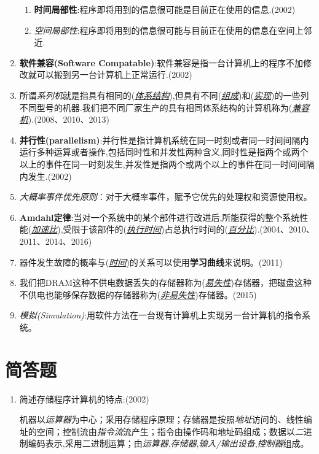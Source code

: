 \documentclass[a4paper]{ctexbook}
\newcommand{\blank}[1]{(\emph{\underline{#1}})}
\begin{document}
\begin{enumerate}
  \begin{enumerate}
    \item \textbf{时间局部性}:程序即将用到的信息很可能是目前正在使用的信息.(2002)
    \item \emph{空间局部性}:程序即将用到的信息很可能与目前正在使用的信息在空间上邻近.
  \end{enumerate}
  \item \textbf{软件兼容(Software Compatable)}:软件兼容是指一台计算机上的程序不加修改就可以搬到另一台计算机上正常运行.(2002)
  \item 所谓\emph{系列机}就是指具有相同的(\emph{\underline{体系结构}}),但具有不同(\emph{\underline{组成}})和(\emph{\underline{实现}})的一些列不同型号的机器.我们把不同厂家生产的具有相同体系结构的计算机称为(\emph{\underline{兼容机}}).(2008、2010、2013)
  \item \textbf{并行性(parallelism)}:并行性是指计算机系统在同一时刻或者同一时间间隔内运行多种运算或者操作,包括同时性和并发性两种含义,同时性是指两个或两个以上的事件在同一时刻发生,并发性是指两个或两个以上的事件在同一时间间隔内发生.(2002)
  \item \emph{大概率事件优先原则}：对于大概率事件，赋予它优先的处理权和资源使用权。
  \item \textbf{Amdahl定律}:当对一个系统中的某个部件进行改进后,所能获得的整个系统性能\blank{加速比},受限于该部件的\blank{执行时间}占总执行时间的\blank{百分比}.(2004、2010、2011、2014、2016)
  \item 器件发生故障的概率与\blank{时间}的关系可以使用\textbf{学习曲线}来说明。(2011)
  \item 我们把DRAM这种不供电数据丢失的存储器称为\blank{易失性}存储器，把磁盘这种不供电也能够保存数据的存储器称为\blank{非易失性}存储器。(2015)
  \item \emph{模拟(Simulation)}:用软件方法在一台现有计算机上实现另一台计算机的指令系统。
\end{enumerate}
\section{简答题}
\begin{enumerate}
  \item {\color{grey}简述存储程序计算机的特点:(2002)
  
  机器以\emph{运算器}为中心；采用存储程序原理；存储器是按照\emph{地址}访问的、线性编址的空间；控制流由\emph{指令流}流产生；指令由操作码和地址码组成；数据以\emph{二}进制编码表示,采用二进制运算；由\emph{运算器},\emph{存储器},\emph{输入/输出设备},\emph{控制器}组成。}

  
\end{enumerate}
\end{document}
